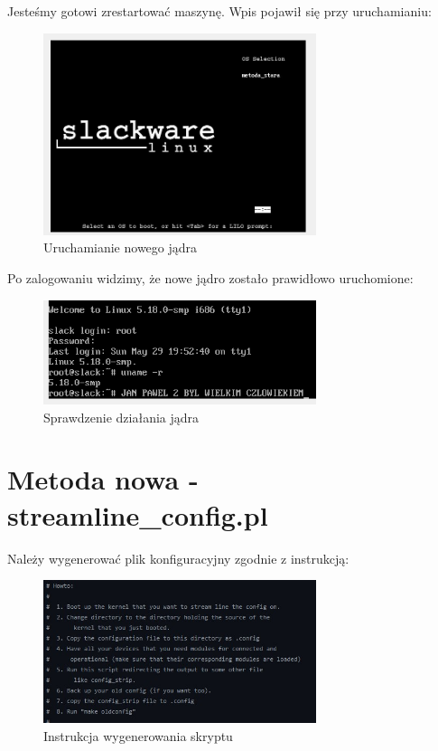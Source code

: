 \documentclass[12pt]{article}
\begin{document}
Jesteśmy gotowi zrestartować maszynę. Wpis pojawił się przy uruchamianiu:

\begin{figure}[H]
\centering
\includegraphics[width=8cm]{uruchamianielionuxa.jpg}
\caption{Uruchamianie nowego jądra}
\end{figure}

Po zalogowaniu widzimy, że nowe jądro zostało prawidłowo uruchomione:

\begin{figure}[H]
\centering
\includegraphics[width=8cm]{sprawdzeniedzialaniametodastara.png}
\caption{Sprawdzenie działania jądra}
\end{figure}

\section{Metoda nowa - streamline_config.pl}

Należy wygenerować plik konfiguracyjny zgodnie z instrukcją:

\begin{figure}[H]
\centering
\includegraphics[width=8cm]{instrukcja.jpg}
\caption{Instrukcja wygenerowania skryptu}
\end{figure}
\end{document}

